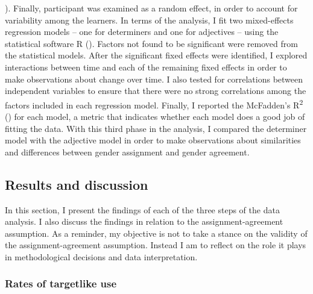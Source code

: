 \documentclass[output=paper,colorlinks,citecolor=brown,modfonts,nonflat]{../langscibook}
\begin{document}
\citealt{Bartning2000,DewaeleVéronique2001}). Finally, participant was examined as a random effect, in order to account for variability among the learners. In terms of the analysis, I fit two mixed-effects regression models – one for determiners and one for adjectives – using the statistical software R (\citealt{RCoreTeam2017}). Factors not found to be significant were removed from the statistical models. After the significant fixed effects were identified, I explored interactions between time and each of the remaining fixed effects in order to make observations about change over time. I also tested for correlations between independent variables to ensure that there were no strong correlations among the factors included in each regression model. Finally, I reported the McFadden’s R\textsuperscript{2} (\citealt{SmithMcKenna2013}) for each model, a metric that indicates whether each model does a good job of fitting the data. With this third phase in the analysis, I compared the determiner model with the adjective model in order to make observations about similarities and differences between gender assignment and gender agreement.


\subsection{Results and discussion}\label{sec:gudmestad:3.2}

In this section, I present the findings of each of the three steps of the data analysis. I also discuss the findings in relation to the assignment-agreement assumption. As a reminder, my objective is not to take a stance on the validity of the assignment-agreement assumption. Instead I am to reflect on the role it plays in methodological decisions and data interpretation. 


\subsubsection{Rates of targetlike use}\label{sec:gudmestad:3.2.1}
\end{document}
